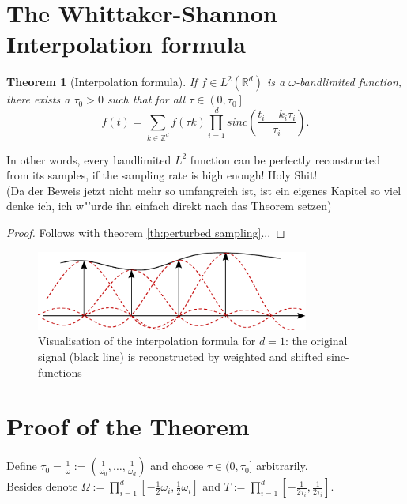 \documentclass[a4paper, 11pt]{scrreprt}
\newtheorem{theorem}[defi]{Theorem}
\newcommand{\RR}{\mathbb{R}}
\newcommand{\ZZ}{\mathbb{Z}}
\begin{document}
\section{The Whittaker-Shannon Interpolation formula}

\begin{theorem}[Interpolation formula]
\label{th:interpolation}
If \(f \in L^2(\RR^d)\) is a \(\omega\)-bandlimited function, there exists a \(\tau_0 > 0\) such that for all \(\tau \in \left(0,\tau_0\right]\)
\begin{equation}
	f(t) = \sum_{k \in \ZZ^d} f(\tau k) \prod_{i=1}^d sinc\left(\frac{t_i-k_i \tau_i}{\tau_i}\right).
\end{equation}
\end{theorem}
In other words, every bandlimited \(L^2\) function can be perfectly reconstructed from its samples, if the sampling rate is high enough! Holy Shit!\\
(Da der Beweis jetzt nicht mehr so umfangreich ist, ist ein eigenes Kapitel so viel denke ich, ich w"'urde ihn einfach direkt nach das Theorem setzen)\\
\begin{proof}[Proof]
Follows with theorem \ref{th:perturbed sampling}...
\end{proof}
\begin{figure}[htpb]
	\centering
	\includegraphics[width=0.80\textwidth]{Rekonstruktion-Visualisierung.pdf}
	\caption{Visualisation of the interpolation formula for \(d=1\): the original signal (black line) is reconstructed by weighted and shifted sinc-functions}
\end{figure}


\section{Proof of the Theorem}
Define \(\tau_0 = \frac{1}{\omega} := \left(\frac{1}{\omega_0}, \ldots, \frac{1}{\omega_d}\right)\) and choose \(\tau \in (0,\tau_0]\) arbitrarily. \\
Besides denote \(\Omega := \prod_{i=1}^d \left[-\frac{1}{2}\omega_i ,\frac{1}{2}\omega_i\right]\) and \(T := \prod_{i=1}^d \left[-\frac{1}{2\tau_i} ,\frac{1}{2\tau_i}\right]\).
\end{document}
